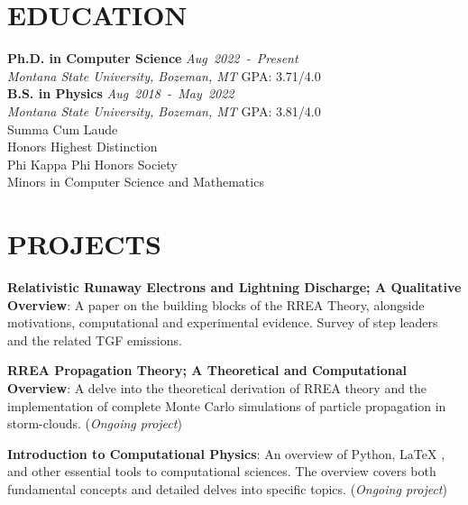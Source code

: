 \documentclass[margin]{res}
\begin{document}
\begin{resume}


\section{EDUCATION}
\raggedright
\textbf{Ph.D. in Computer Science} \hfill \textit{Aug~2022~-~Present}\\
\textit{Montana State University, Bozeman, MT} \hfill GPA: 3.71/4.0\vspace*{1ex}\\
\textbf{B.S. in Physics} \hfill \textit{Aug~2018~-~May~2022}\\
\textit{Montana State University, Bozeman, MT} \hfill GPA: 3.81/4.0\\
	\hspace{3ex} Summa Cum Laude\\
	\hspace{3ex} Honors Highest Distinction\\
	\hspace{3ex} Phi Kappa Phi Honors Society\\
	\hspace{3ex} Minors in Computer Science and Mathematics


\section{PROJECTS}
\raggedright
\par
\textbf{Relativistic Runaway Electrons and Lightning Discharge; A Qualitative Overview}: 
A paper on the building blocks of the RREA Theory, alongside motivations, computational and experimental evidence. Survey of step leaders and the related TGF emissions.
\par
\textbf{RREA Propagation Theory; A Theoretical and Computational Overview}:
A delve into the theoretical derivation of RREA theory and the implementation of complete Monte Carlo simulations of particle propagation in storm-clouds. ({\sl Ongoing project})
\par 
\textbf{Introduction to Computational Physics}:
An overview of Python, LaTeX , and other essential tools to computational sciences. The overview covers both fundamental concepts and detailed delves into specific topics. ({\sl Ongoing project})


\end{resume}
\end{document}

